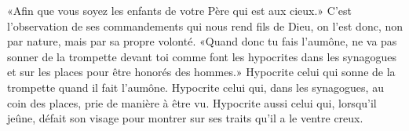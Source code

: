 «Afin que vous soyez les enfants de votre Père qui est aux cieux.»
C'est l'observation de ses commandements qui nous rend fils de Dieu,
	on l'est donc, non par nature, mais par sa propre volonté.
«Quand donc tu fais l'aumône, ne va pas sonner de la trompette devant toi
	comme font les hypocrites dans les synagogues et sur les places
	pour être honorés des hommes.»
Hypocrite celui qui sonne de la trompette quand il fait l'aumône.
Hypocrite celui qui, dans les synagogues, au coin des places,
		prie de manière à être vu.
Hypocrite aussi celui qui, lorsqu'il jeûne,
	défait son visage pour montrer sur ses traits qu'il a le ventre creux.
